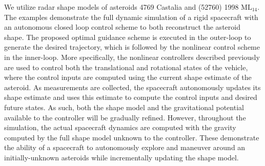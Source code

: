\documentclass[journal]{new-aiaa}
\begin{document}
We utilize radar shape models of asteroids \num{4769} Castalia and (\num{52760}) \num{1998} \(\text{ML}_{14}\).
The examples demonstrate the full dynamic simulation of a rigid spacecraft with an autonomous closed loop control scheme to both reconstruct the asteroid shape.
The proposed optimal guidance scheme is executed in the outer-loop to generate the desired trajectory, which is followed by the nonlinear control scheme in the inner-loop. 
More specifically, the nonlinear controllers described previously are used to control both the translational and rotational states of the vehicle, where the control inputs are computed using the current shape estimate of the asteroid. 
As measurements are collected, the spacecraft autonomously updates its shape estimate and uses this estimate to compute the control inputs and desired future states.
As such, both the shape model and the gravitational potential available to the controller will be gradually refined. 
However, throughout the simulation, the actual spacecraft dynamics are computed with the gravity computed by the full shape model unknown to the controller.
These demonstrate the ability of a spacecraft to autonomously explore and maneuver around an initially-unknown asteroids while incrementally updating the shape model.
\end{document}

